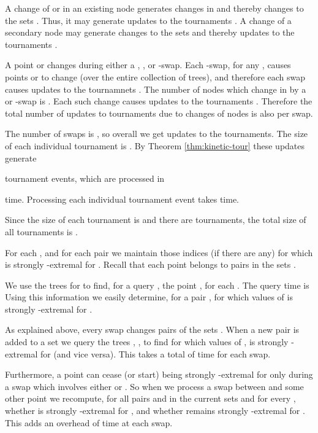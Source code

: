 \documentclass[letter,11pt]{article}
\begin{document}
A change of  or  in an existing
node  generates  changes in  and thereby 
changes to the sets .  Thus, it may generate  updates to the
tournaments . A change of a secondary node may
generate  changes to the sets  and thereby  updates
to the tournaments .

A point  or  changes during either
a , , or -swap.  Each -swap, for any , causes 
points  or  to change (over the entire collection of trees), and
therefore each swap causes  updates to the tournamnets
.  The number of nodes which
change in  by a  or -swap is . Each
such change causes  updates to the tournaments .
Therefore the total number of updates to tournaments due to changes of
nodes is also  per swap.

The number of swaps is , so overall we get 
updates to the tournaments.  The size of each individual tournament is
.
By Theorem \ref{thm:kinetic-tour} these updates generate

tournament
events, which are processed in
 
time.
Processing each individual tournament event takes  time.
 
Since the size of each tournament is  and there are  tournaments, the
total size of all tournaments is .


\smallskip

For each , and for each pair  we maintain
those indices  (if there are any) for which
 is  strongly -extremal for .
Recall that each point  belongs to  pairs in the sets
.

We use the trees  for  to find, for a query 
, the  point , for each . The query time is  
Using this information we easily determine,
 for a pair ,
for which values of 
 is  strongly -extremal for .




As explained above, every swap changes
 pairs of the sets .
When a new pair is added to a set   we query the trees
, , to find for which values of ,  is
strongly -extremal for  (and vice versa).
This takes a total of  time for each
swap.

Furthermore, a point  can cease (or start) being  strongly
-extremal for  only during a swap which involves either  or . 
So when we process a swap 
between  and some other point we
recompute, for all pairs  and  in the current 
sets  and for every
,
 whether  is  strongly -extremal for , and whether  remains  strongly -extremal for .
This adds an overhead of
 time at each
swap. 
\end{document}

